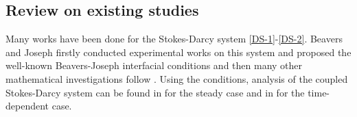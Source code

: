 \subsection{Review on existing studies}

Many works have been done for the Stokes-Darcy system \eqref{DS-1}-\eqref{DS-2}.
Beavers and Joseph \cite{BeaversJoseph:1967} firstly conducted experimental works on this system and proposed the well-known Beavers-Joseph interfacial conditions and then many other mathematical investigations follow \cite{Ene:1975,JagerMikelic:1996,MikelicJager:2000,JagerMikelicNeuss:2001,LevySanchez:1975,MarusicMikelic:2000}.
Using the conditions, analysis of the coupled Stokes-Darcy system  can be found in \cite{BurmanHansbo:2007,DAngeloZunino:2009,DiscacciatiMiglio:2002,LaytonFriedhelmYotov:2003,Riviere:2005,RiviereYotov:2005} for the steady case and in \cite{CaoGunzburgerHuaWang:2010,Zunino:2002} for the time-dependent case.

